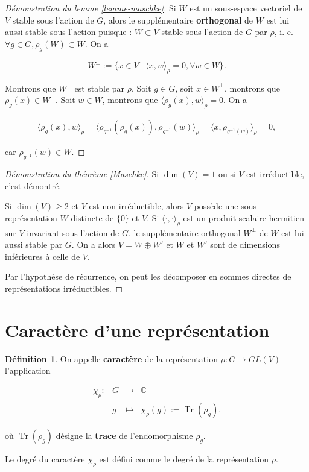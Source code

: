 \documentclass[french]{book}
\theoremstyle{definition}
\newtheorem{protodefinition}{Définition}[section]
\newenvironment{definition}
    {\colorlet{shadecolor}{green!5}\begin{shaded}\begin{protodefinition}}
    {\end{protodefinition}\end{shaded}}
\theoremstyle{remark}
\begin{document}
\begin{proof}[Démonstration du lemme \ref{lemme-maschke}]
  Si \(W\) est un sous-espace vectoriel de \(V\) stable sous l'action de \(G\), alors le supplémentaire \textbf{orthogonal} de \(W\) est lui aussi stable sous l'action puisque : \(W \subset V\) stable sous l'action de \(G\) par \(\rho\), i. e. \( \forall g \in G, \rho_g(W) \subset W\). On a

  \[W ^{\perp} := \{  x \in V \mid \langle x, w \rangle _{\rho} = 0,  \forall w \in W \}.\]

  Montrons que \( W ^{\perp}\) est stable par \(\rho\). Soit \(g \in G\), soit \(x \in W ^{\perp}\), montrons que \(\rho_g(x) \in W ^{\perp}\). Soit \(w \in W\), montrons que \(\langle \rho_g(x), w \rangle _{\rho}=0\). On a

  \begin{gather*}
    \langle \rho_g(x), w \rangle_{\rho} = \langle \rho _{g ^{-1} }(\rho_g(x)), \rho _{g ^{-1} }(w) \rangle _{\rho} = \langle x, \rho _{g ^{-1} (w)} \rangle _{\rho} = 0,
  \end{gather*}

  car \(\rho _{g ^{-1} }(w) \in W\).
\end{proof}

\begin{proof}[Démonstration du théorème \ref{Maschke}]
  Si \(\operatorname{dim}(V)=1\) ou si \(V\) est irréductible, c'est démontré.

  Si \(\operatorname{dim}(V) \geq 2\) et \(V\) est non irréductible, alors \(V\) possède une sous-représentation \(W\) distincte de \(\{ 0 \} \) et \(V\). Si \(\langle \cdot, \cdot \rangle _{\rho}\) est un produit scalaire hermitien sur \(V\) invariant sous l'action de \(G\), le supplémentaire orthogonal \(W ^{\perp}\) de \(W\) est lui aussi stable par \(G\). On a alors \(V = W \oplus W'\) et \(W\) et \(W'\) sont de dimensions inférieures à celle de \(V\).

  Par l'hypothèse de récurrence, on peut les décomposer en sommes directes de représentations irréductibles.
\end{proof}

\section{Caractère d'une représentation}

\begin{definition}
  On appelle \textbf{caractère} de la représentation \(\rho : G \longrightarrow GL(V)\) l'application

  \[\begin{matrix}
  \chi_{\rho} : & G & \longrightarrow & \mathbb{C} \\
  \ & g & \longmapsto & \chi_{\rho}(g) := \operatorname{Tr}(\rho_g).
  \end{matrix}\]

  où \(\operatorname{Tr}(\rho_g)\) désigne la \textbf{trace} de l'endomorphisme \(\rho_g\).

  Le degré du caractère \(\chi_\rho\) est défini comme le degré de la représentation \(\rho\).
\end{definition}
\end{document}
